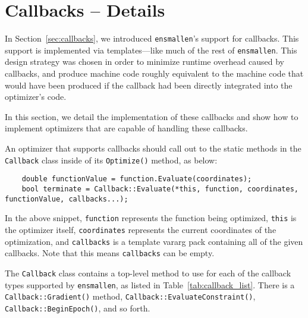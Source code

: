 \section{Callbacks -- Details}
\label{sec:callback_details}

In Section~\ref{sec:callbacks}, we introduced {\tt ensmallen}'s support for
callbacks.  This support is implemented via templates---like much of the rest of
{\tt ensmallen}.  This design strategy was chosen in order to minimize runtime
overhead caused by callbacks, and produce machine code roughly equivalent to the
machine code that would have been produced if the callback had been directly
integrated into the optimizer's code.

In this section, we detail the implementation of these callbacks and show how to
implement optimizers that are capable of handling these callbacks.

An optimizer that supports callbacks should call out to the static methods in
the {\tt Callback} class inside of its {\tt Optimize()} method, as below:
%
\begin{verbatim}
    double functionValue = function.Evaluate(coordinates);
    bool terminate = Callback::Evaluate(*this, function, coordinates, functionValue, callbacks...);
\end{verbatim}

In the above snippet, {\tt function} represents the function being optimized,
{\tt *this} is the optimizer itself, {\tt coordinates} represents the current
coordinates of the optimization, and {\tt callbacks} is a template vararg pack
containing all of the given callbacks.
Note that this means {\tt callbacks} can be empty.

The {\tt Callback} class contains a top-level method to use for each of the
callback types supported by {\tt ensmallen}, as listed in Table~\ref{tab:callback_list}.
There is a {\tt Callback::Gradient()} method, {\tt Callback::EvaluateConstraint()},
{\tt Callback::BeginEpoch()}, and so forth. 

